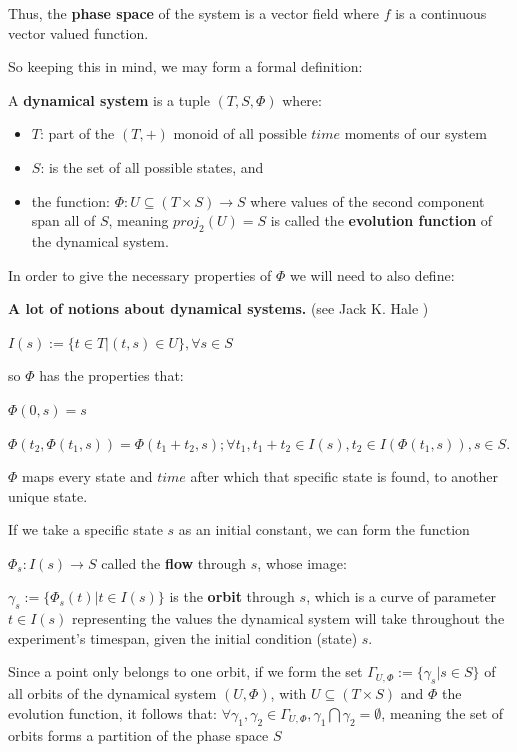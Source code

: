 Thus, the \textbf{phase space} of the system is a vector field where $f$ is a continuous vector valued function.

So keeping this in mind, we may form a formal definition:

\begin{definition}
	A \textbf{dynamical system} is a tuple $(T,S,\Phi)$ where:

	\begin{itemize}
		\item $T$: part of the $(T,+)$ monoid of all possible $time$ moments of our system
		\item $S$: is the set of all possible states, and
		\item the function: $\Phi : U \subseteq (T \times S ) \rightarrow S$ where values of the second component span all of $S$, meaning $proj_2(U) = S$ is called the \textbf{evolution function} of the dynamical system.
	\end{itemize}
	In order to give the necessary properties of $\Phi$ we will need to also define:
	\begin{definition}\label{dyn_sys_orbit_flow_etc_def}
		\textbf{A lot of notions about dynamical systems.} (see Jack K. Hale \cite{hale1996})

		$I(s):= \{ t \in T | (t,s) \in U \}, \forall s \in S$

		so $\Phi$ has the properties that:

		$\Phi(0,s) = s$

		$\Phi(t_2,\Phi(t_1,s)) = \Phi(t_1+t_2,s); \forall t_1, t_1+t_2 \in I(s), t_2 \in I(\Phi(t_1,s)), s \in S$.

		$\Phi$ maps every state and $time$ after which that specific state is found, to another unique state.
	\end{definition}

	If we take a specific state $s$ as an initial constant, we can form the function

	$\Phi_s : I(s) \rightarrow S$
	called the \textbf{flow} through $s$, whose image:

	$\gamma_s:=\{\Phi_s(t) | t\in I(s) \}$
	is the \textbf{orbit} through $s$,
	which is a curve of parameter $t \in I(s)$ representing the values the dynamical system will take throughout the experiment's timespan, given the initial condition (state) $s$.
\end{definition}

Since a point only belongs to one orbit, if we form the set
$\Gamma_{U,\Phi}:=\{ \gamma_s | s \in S \}$
of all orbits of the dynamical system $(U,\Phi)$, with $U\subseteq (T \times S)$ and $\Phi$ the evolution function, it follows that:
$\forall \gamma_1,\gamma_2 \in \Gamma_{U, \Phi}, \gamma_1 \bigcap \gamma_2 = \emptyset$, meaning the set of orbits forms a partition of the phase space $S$

